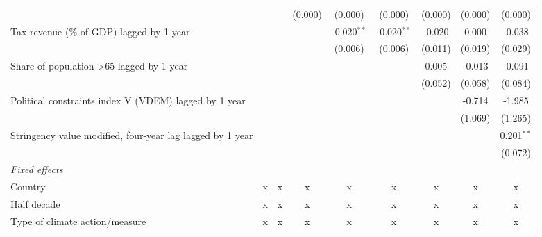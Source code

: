 \begin{tabular}{lcccccccc}
                                                                    &         &         & (0.000) & (0.000)       & (0.000)       & (0.000)      & (0.000)      & (0.000)\\   
   Tax revenue (\% of GDP) lagged by 1 year                         &         &         &         & -0.020$^{**}$ & -0.020$^{**}$ & -0.020       & 0.000        & -0.038\\   
                                                                    &         &         &         & (0.006)       & (0.006)       & (0.011)      & (0.019)      & (0.029)\\   
   Share of population >65 lagged by 1 year                         &         &         &         &               &               & 0.005        & -0.013       & -0.091\\   
                                                                    &         &         &         &               &               & (0.052)      & (0.058)      & (0.084)\\   
   Political constraints index V (VDEM) lagged by 1 year            &         &         &         &               &               &              & -0.714       & -1.985\\   
                                                                    &         &         &         &               &               &              & (1.069)      & (1.265)\\   
   Stringency value modified, four-year lag lagged by 1 year        &         &         &         &               &               &              &              & 0.201$^{**}$\\   
                                                                    &         &         &         &               &               &              &              & (0.072)\\   
   \emph{Fixed effects}\\
   Country                                                          & x       & x       & x       & x             & x             & x            & x            & x\\  
   Half decade                                                      & x       & x       & x       & x             & x             & x            & x            & x\\  
   Type of climate action/measure                                   & x       & x       & x       & x             & x             & x            & x            & x\\  

\end{tabular}
